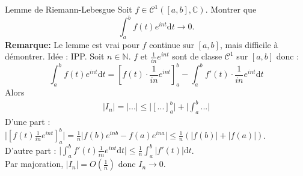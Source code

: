 \documentclass[11pt]{article}
\newcommand*{\C}{\mathbb{C}}
\newcommand*{\N}{\mathbb{N}}
\newcommand*{\m}{\mathcal}
\newcommand{\0}{\varnothing}
\newcommand{\dt}{\textrm{d}t}
\begin{document}
\begin{ex}{Lemme de Riemann-Lebesgue}{}
    Soit $f\in\m{C}^1([a,b],\C)$. Montrer que
    \begin{equation*}
        \int_a^bf(t)e^{int}\dt\to0.
    \end{equation*}
    \textbf{Remarque:} Le lemme est vrai pour $f$ continue sur $[a,b]$, mais difficile à démontrer.
    \tcblower
    Idée : IPP. Soit $n\in\N$. $f$ et $\frac{1}{in}e^{int}$ sont de classe $\m{C}^1$ sur $[a,b]$ donc :
    \begin{equation*}
        \int_a^bf(t)e^{int}\dt=\left[ f(t)\cdot\frac{1}{in}e^{int} \right]_a^b - \int_a^b f'(t)\cdot\frac{1}{in}e^{int}\dt
    \end{equation*}
    Alors
    \begin{align*}
        |I_n|=\Big|...\Big|\leq \Big|[...]_a^b\Big| + \Big|\int_a^b...\Big|
    \end{align*}
    D'une part : $\Big|\left[ f(t)\frac{1}{in} e^{int}\right]_a^b\Big|=\frac{1}{n}\Big|f(b)e^{inb}-f(a)e^{ina}\Big|\leq\frac{1}{n}(|f(b)|+|f(a)|)$.\\
    D'autre part : $\Big|\int_a^bf'(t)\frac{1}{in}e^{int}\dt\Big|\leq\frac{1}{n}\int_a^b\Big|f'(t)\Big|\dt$.\\
    Par majoration, $|I_n|=O(\frac{1}{n})$ donc $I_n\to0$.
\end{ex}
\end{document}

